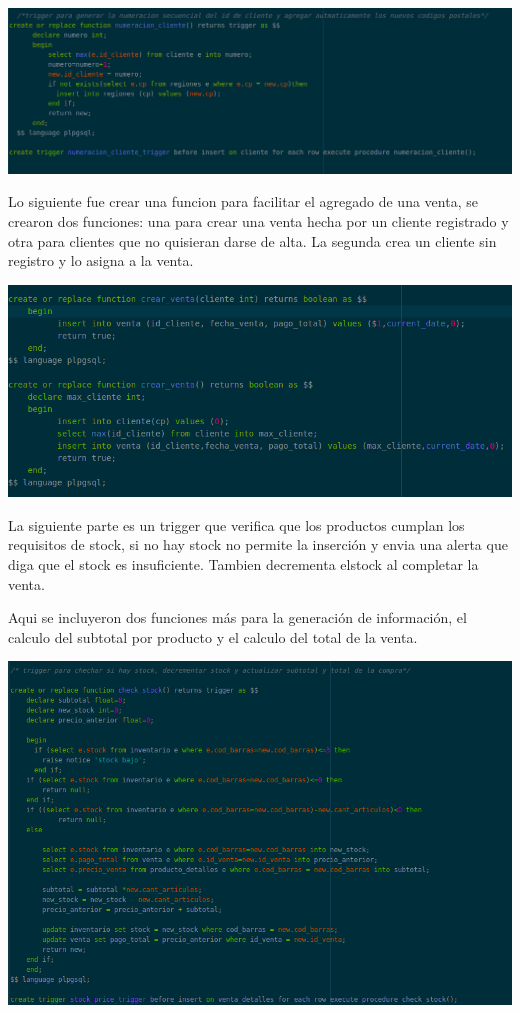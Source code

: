 \documentclass[12pt, letterpaper]{article}     %
\begin{document}
	\begin{center}
   	\includegraphics[scale=0.40]{req23}
	\end{center}
	
	Lo siguiente fue crear una funcion para facilitar el agregado de una venta, se crearon dos funciones: una para crear una venta hecha por un cliente registrado y otra para clientes que no quisieran darse de alta. La segunda crea un cliente sin registro y lo asigna a la venta.
	
	\begin{center}
   	\includegraphics[scale=0.40]{req2}
	\end{center}
	
	La siguiente parte es un trigger que verifica que los productos cumplan los requisitos de stock, si no hay stock no permite la inserción y envia una alerta que diga que el stock es insuficiente. Tambien decrementa elstock al completar la venta.
	
	Aqui se incluyeron dos funciones más para la generación de información, el calculo del subtotal por producto y el calculo del total de la venta.	
	
	
	\begin{center}
   	\includegraphics[scale=0.40]{req26}
	\end{center}
	
\end{document}
